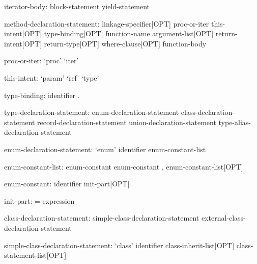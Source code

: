 \begin{syntax}
iterator-body:
  block-statement
  yield-statement
\end{syntax}

\begin{syntax}
method-declaration-statement:
  linkage-specifier[OPT] proc-or-iter this-intent[OPT] type-binding[OPT] function-name argument-list[OPT] 
    return-intent[OPT] return-type[OPT] where-clause[OPT] function-body
\end{syntax}

\begin{syntax}
proc-or-iter:
  `proc'
  `iter'
\end{syntax}

\begin{syntax}
this-intent:
  `param'
  `ref'
  `type'
\end{syntax}

\begin{syntax}
type-binding:
  identifier .
\end{syntax}

\begin{syntax}
type-declaration-statement:
  enum-declaration-statement
  class-declaration-statement
  record-declaration-statement
  union-declaration-statement
  type-alias-declaration-statement
\end{syntax}

\begin{syntax}
enum-declaration-statement:
  `enum' identifier { enum-constant-list }
\end{syntax}

\begin{syntax}
enum-constant-list:
  enum-constant
  enum-constant , enum-constant-list[OPT]
\end{syntax}

\begin{syntax}
enum-constant:
  identifier init-part[OPT]
\end{syntax}

\begin{syntax}
init-part:
  = expression
\end{syntax}

\begin{syntax}
class-declaration-statement:
  simple-class-declaration-statement
  external-class-declaration-statement
\end{syntax}

\begin{syntax}
simple-class-declaration-statement:
  `class' identifier class-inherit-list[OPT] { class-statement-list[OPT] }
\end{syntax}

